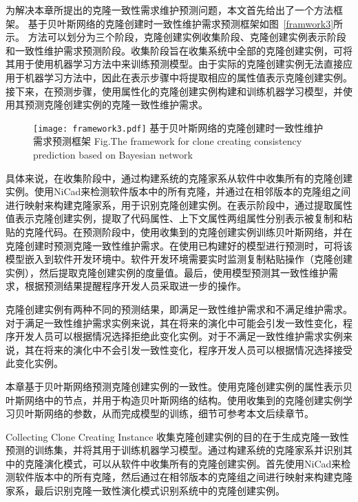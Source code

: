 为解决本章所提出的克隆一致性需求维护预测问题，本文首先给出了一个方法框架。
基于贝叶斯网络的克隆创建时一致性维护需求预测框架如图~\ref{framwork3}所示。
方法可以划分为三个阶段，克隆创建实例收集阶段、克隆创建实例表示阶段和一致性维护需求预测阶段。收集阶段旨在收集系统中全部的克隆创建实例，可将其用于使用机器学习方法中来训练预测模型。由于实际的克隆创建实例无法直接应用于机器学习方法中，因此在表示步骤中将提取相应的属性值表示克隆创建实例。接下来，在预测步骤，使用属性化的克隆创建实例构建和训练机器学习模型，并使用其预测克隆创建实例的克隆一致性维护需求。

\begin{figure}[htbp]
\centering
\texttt{[image: framework3.pdf]}
\bicaption[framwork3]{}
{基于贝叶斯网络的克隆创建时一致性维护需求预测框架}
{Fig.$\!$}{The framework for clone creating consistency prediction based on Bayesian network}
\vspace{-1em}
\end{figure}

具体来说，在收集阶段中，通过构建系统的克隆家系从软件中收集所有的克隆创建实例。使用NiCad来检测软件版本中的所有克隆，并通过在相邻版本的克隆组之间进行映射来构建克隆家系，用于识别克隆创建实例。在表示阶段中，通过提取属性值表示克隆创建实例，提取了代码属性、上下文属性两组属性分别表示被复制和粘贴的克隆代码。在预测阶段中，使用收集到的克隆创建实例训练贝叶斯网络，并在克隆创建时预测克隆一致性维护需求。在使用已构建好的模型进行预测时，可将该模型嵌入到软件开发环境中。软件开发环境需要实时监测复制粘贴操作（克隆创建实例），然后提取克隆创建实例的度量值。最后，使用模型预测其一致性维护需求，根据预测结果提醒程序开发人员采取进一步的操作。

克隆创建实例有两种不同的预测结果，即满足一致性维护需求和不满足维护需求。
对于满足一致性维护需求实例来说，其在将来的演化中可能会引发一致性变化，程序开发人员可以根据情况选择拒绝此变化实例。对于不满足一致性维护需求实例来说，其在将来的演化中不会引发一致性变化，程序开发人员可以根据情况选择接受此变化实例。

本章基于贝叶斯网络预测克隆创建实例的一致性。使用克隆创建实例的属性表示贝叶斯网络中的节点，并用于构造贝叶斯网络的结构。使用收集到的克隆创建实例学习贝叶斯网络的参数，从而完成模型的训练，细节可参考本文后续章节。

{Collecting Clone Creating Instance}
\label{lab-checkcopied}
收集克隆创建实例的目的在于生成克隆一致性预测的训练集，并将其用于训练机器学习模型。通过构建系统的克隆家系并识别其中的克隆演化模式，可以从软件中收集所有的克隆创建实例。首先使用NiCad来检测软件版本中的所有克隆，然后通过在相邻版本的克隆组之间进行映射来构建克隆家系，最后识别克隆一致性演化模式识别系统中的克隆创建实例。

